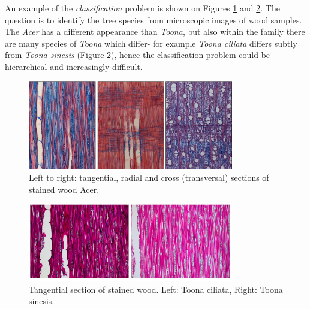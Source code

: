 An example of the {\em classification} problem is shown on Figures \ref{fig:woodphotoid} and \ref{fig:treeid}. The question is to identify the tree species from microscopic images of wood samples. The {\em Acer} has a different appearance than {\em Toona}, but also within the family there are many species of {\em Toona} which differ- for example {\em Toona ciliata} differs subtly from {\em Toona sinesis} (Figure \ref{fig:treeid}), hence the classification problem could be hierarchical and increasingly difficult.

\begin{figure}[H]
\begin{center}
\includegraphics[width=0.8\textwidth]{fig/woodphotoid}
\end{center}
\caption{Left to right: tangential, radial and cross (transversal) sections of stained wood Acer.}
\label{fig:woodphotoid}
\end{figure}

\begin{figure}[H]
\begin{center}
\includegraphics[width=0.8\textwidth]{fig/treeid}
\end{center}
\caption{Tangential section of stained wood. Left: Toona ciliata, Right: Toona sinesis.}
\label{fig:treeid}
\end{figure}

